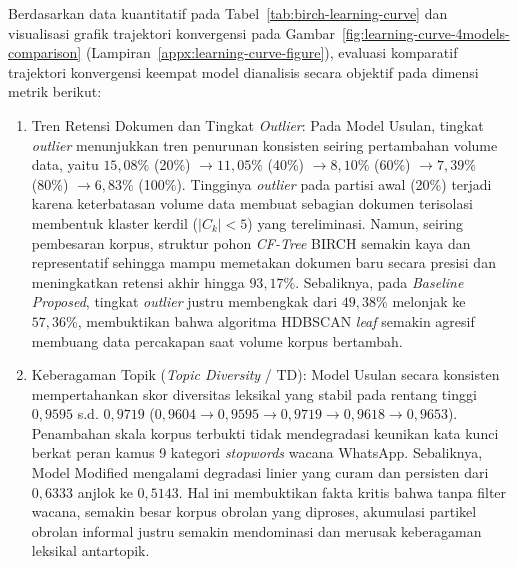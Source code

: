 

Berdasarkan data kuantitatif pada Tabel~\ref{tab:birch-learning-curve} dan visualisasi grafik trajektori konvergensi pada Gambar~\ref{fig:learning-curve-4models-comparison} (Lampiran~\ref{appx:learning-curve-figure}), evaluasi komparatif trajektori konvergensi keempat model dianalisis secara objektif pada dimensi metrik berikut:

\begin{enumerate}[label=\alph*., leftmargin=*, itemsep=4pt]
    \item Tren Retensi Dokumen dan Tingkat \textit{Outlier}:
    Pada Model Usulan, tingkat \textit{outlier} menunjukkan tren penurunan konsisten seiring pertambahan volume data, yaitu $15{,}08\%$ (20\%) $\rightarrow 11{,}05\%$ (40\%) $\rightarrow 8{,}10\%$ (60\%) $\rightarrow 7{,}39\%$ (80\%) $\rightarrow 6{,}83\%$ (100\%). Tingginya \textit{outlier} pada partisi awal (20\%) terjadi karena keterbatasan volume data membuat sebagian dokumen terisolasi membentuk klaster kerdil ($|C_k| < 5$) yang tereliminasi. Namun, seiring pembesaran korpus, struktur pohon \textit{CF-Tree} BIRCH semakin kaya dan representatif sehingga mampu memetakan dokumen baru secara presisi dan meningkatkan retensi akhir hingga $93{,}17\%$. Sebaliknya, pada \textit{Baseline Proposed}, tingkat \textit{outlier} justru membengkak dari $49{,}38\%$ melonjak ke $57{,}36\%$, membuktikan bahwa algoritma HDBSCAN \textit{leaf} semakin agresif membuang data percakapan saat volume korpus bertambah.

    \item Keberagaman Topik (\textit{Topic Diversity} / TD):
    Model Usulan secara konsisten mempertahankan skor diversitas leksikal yang stabil pada rentang tinggi $0{,}9595$ s.d. $0{,}9719$ ($0{,}9604 \rightarrow 0{,}9595 \rightarrow 0{,}9719 \rightarrow 0{,}9618 \rightarrow 0{,}9653$). Penambahan skala korpus terbukti tidak mendegradasi keunikan kata kunci berkat peran kamus 9 kategori \textit{stopwords} wacana WhatsApp. Sebaliknya, Model Modified mengalami degradasi linier yang curam dan persisten dari $0{,}6333$ anjlok ke $0{,}5143$. Hal ini membuktikan fakta kritis bahwa tanpa filter wacana, semakin besar korpus obrolan yang diproses, akumulasi partikel obrolan informal justru semakin mendominasi dan merusak keberagaman leksikal antartopik.


\end{enumerate}

